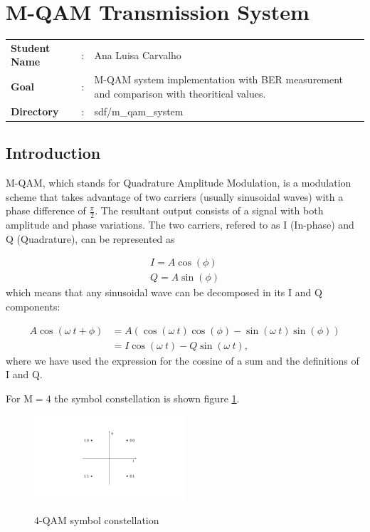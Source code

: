 \clearpage
\section{M-QAM Transmission System}

\begin{tcolorbox}	
	\begin{tabular}{p{2.75cm} p{0.2cm} p{10.5cm}} 	
		\textbf{Student Name}  &:& Ana Luisa Carvalho\\
		\textbf{Goal}          &:& M-QAM system implementation with BER measurement and comparison with theoritical values.\\
		\textbf{Directory} &:& sdf/m\_qam\_system
	\end{tabular}
\end{tcolorbox}

\subsection{Introduction}

M-QAM, which stands for Quadrature Amplitude Modulation, is a modulation scheme that takes advantage of two carriers (usually sinusoidal waves) with a phase difference of $\frac{\pi}{2}$. The resultant output consists of a signal with both amplitude and phase variations. The two carriers, refered to as I (In-phase) and Q (Quadrature), can be represented as 

\begin{align}
	I=A\cos(\phi) \\
	Q=A\sin(\phi)
\end{align}
which means that any sinusoidal wave can be decomposed in its I and Q components:

\begin{align}
A\cos(\omega~t+\phi)&=A\left(\cos(\omega~t)\cos(\phi)-\sin(\omega~t)\sin(\phi)\right) \\
&=I\cos(\omega~t)-Q\sin(\omega~t),
\end{align} 
where we have used the expression for the cossine of a sum and the definitions of I and Q.

For M$=4$ the symbol constellation is shown figure \ref{fig:MQAM_constellation}.

\begin{figure}
	\centering
	\includegraphics[width=0.5\textwidth]{./figures/MQAM_constellation}
	\label{fig:MQAM_constellation}
	\caption{4-QAM symbol constellation}
\end{figure}

